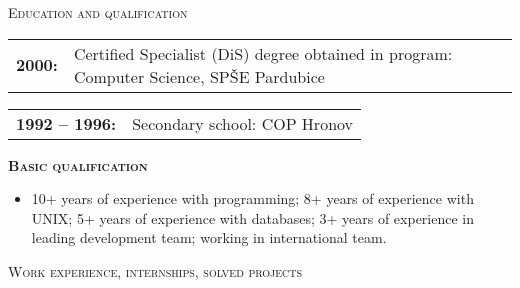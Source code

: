 \begin{cv}
\begin{cvlist}{\large \textsc{Education and qualification}}

  \item \begin{tabular}{p{2.8cm}p{11cm}} {\bf{2000:}} & Certified
    Specialist (DiS) degree obtained in program: Computer Science,
    SPŠE Pardubice
  \end{tabular}


  \item \begin{tabular}{p{2.8cm}p{11cm}}
   {\bf{1992 -- 1996:}} & Secondary school: COP Hronov
   \end{tabular}
   
   \item {\bf{\textsc{Basic qualification}}} \begin{itemize}
    \item[] \vspace{-0.3cm} 10+ years of experience with programming; 8+
      years of experience with UNIX; 5+ years of experience with
      databases; 3+ years of experience in leading development team;
      working in international team.

   \end{itemize}  
\end{cvlist}






\noindent\hrulefill
\begin{cvlist}{\large \textsc{Work experience, internships, solved projects}}


\end{cvlist}
\end{cv}
